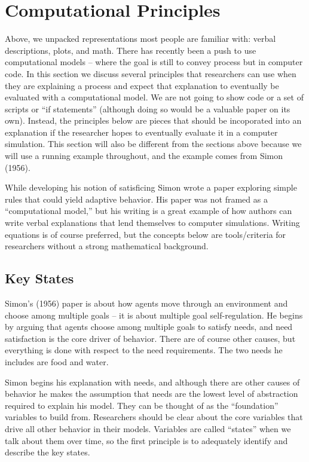 \documentclass[english,,man]{apa6}
\theoremstyle{definition}
\theoremstyle{definition}
\theoremstyle{definition}
\theoremstyle{remark}
\begin{document}
\hypertarget{computational-principles}{%
\section{Computational Principles}\label{computational-principles}}

Above, we unpacked representations most people are familiar with: verbal
descriptions, plots, and math. There has recently been a push to use
computational models -- where the goal is still to convey process but in
computer code. In this section we discuss several principles that
researchers can use when they are explaining a process and expect that
explanation to eventually be evaluated with a computational model. We
are not going to show code or a set of scripts or \enquote{if
statements} (although doing so would be a valuable paper on its own).
Instead, the principles below are pieces that should be incoporated into
an explanation if the researcher hopes to eventually evaluate it in a
computer simulation. This section will also be different from the
sections above because we will use a running example throughout, and the
example comes from Simon (1956).

While developing his notion of satisficing Simon wrote a paper exploring
simple rules that could yield adaptive behavior. His paper was not
framed as a \enquote{computational model,} but his writing is a great
example of how authors can write verbal explanations that lend
themselves to computer simulations. Writing equations is of course
preferred, but the concepts below are tools/criteria for researchers
without a strong mathematical background.

\hypertarget{key-states}{%
\subsection{Key States}\label{key-states}}

Simon's (1956) paper is about how agents move through an environment and
choose among multiple goals -- it is about multiple goal
self-regulation. He begins by arguing that agents choose among multiple
goals to satisfy needs, and need satisfaction is the core driver of
behavior. There are of course other causes, but everything is done with
respect to the need requirements. The two needs he includes are food and
water.

Simon begins his explanation with needs, and although there are other
causes of behavior he makes the assumption that needs are the lowest
level of abstraction required to explain his model. They can be thought
of as the \enquote{foundation} variables to build from. Researchers
should be clear about the core variables that drive all other behavior
in their models. Variables are called \enquote{states} when we talk
about them over time, so the first principle is to adequately identify
and describe the key states.
\end{document}

